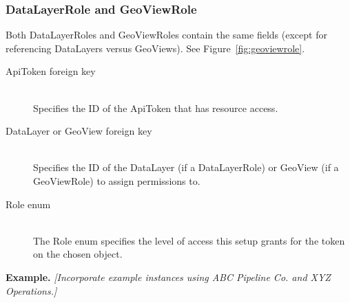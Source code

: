 \subsubsection{DataLayerRole and GeoViewRole}

Both DataLayerRoles and GeoViewRoles contain the same fields (except for referencing DataLayers versus GeoViews). See Figure~\ref{fig:geoviewrole}.


\begin{description}
\item[ApiToken foreign key] \hfill \\
Specifies the ID of the ApiToken that has resource access.

\item[DataLayer or GeoView foreign key] \hfill \\
Specifies the ID of the DataLayer (if a DataLayerRole) or GeoView (if a GeoViewRole) to assign permissions to.

\item[Role enum] \hfill \\
The Role enum specifies the level of access this setup grants for the token on the chosen object.
\end{description}


\textbf{Example.} \textit{[Incorporate example instances using ABC Pipeline Co. and XYZ Operations.]}

\label{design_srid}
